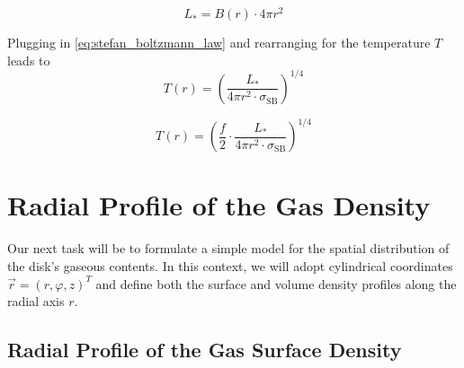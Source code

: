     \begin{equation}
        L_* = B(r) \cdot 4\pi r^2
    \end{equation}

    Plugging in \cref{eq:stefan_boltzmann_law} and rearranging for the temperature $T$ leads to
    \begin{equation}
        T(r) = \left(
            \frac{L_*}{4\pi r^2 \cdot \sigma_\text{SB}}
        \right)^{1/4}
    \end{equation}

    \begin{equation}
    \boxed{
        T(r) = \left(
            \frac{f}{2}\cdot
            \frac{L_*}{4\pi r^2 \cdot \sigma_\text{SB}}
        \right)^{1/4}
    }
    \end{equation}

    


\clearpage\section{Radial Profile of the Gas Density}

    Our next task will be to formulate a simple model for the spatial distribution of the disk's 
    gaseous contents. In this context, we will adopt cylindrical coordinates 
    $\vec r=(r, \varphi, z)^T$ and define both the surface and volume density profiles along the 
    radial axis $r$.

    \subsection{Radial Profile of the Gas Surface Density}

